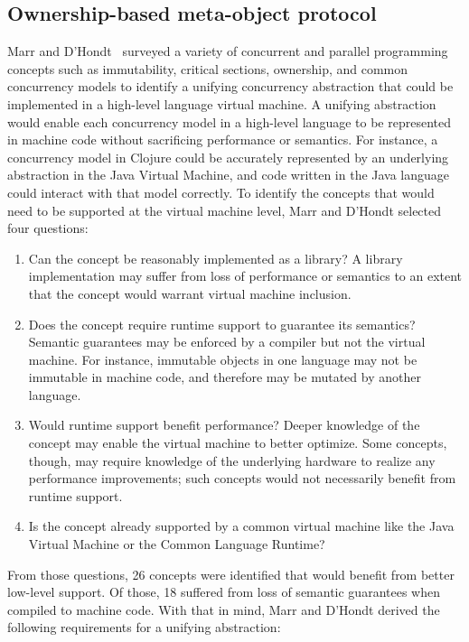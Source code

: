 \documentclass{sig-alternate}
\begin{document}
\subsection{Ownership-based meta-object protocol}

Marr and D'Hondt~\cite{Marr2012} surveyed a variety of concurrent and parallel programming concepts such as immutability, critical sections, ownership, and common concurrency models to identify a unifying concurrency abstraction that could be implemented in a high-level language virtual machine. A unifying abstraction would enable each concurrency model in a high-level language to be represented in machine code without sacrificing performance or semantics. For instance, a concurrency model in Clojure could be accurately represented by an underlying abstraction in the Java Virtual Machine, and code written in the Java language could interact with that model correctly. To identify the concepts that would need to be supported at the virtual machine level, Marr and D'Hondt selected four questions:

\begin{enumerate}
  \item Can the concept be reasonably implemented as a library? A library implementation may suffer from loss of performance or semantics to an extent that the concept would warrant virtual machine inclusion.

  \item Does the concept require runtime support to guarantee its semantics? Semantic guarantees may be enforced by a compiler but not the virtual machine. For instance, immutable objects in one language may not be immutable in machine code, and therefore may be mutated by another language.

  \item Would runtime support benefit performance? Deeper knowledge of the concept may enable the virtual machine to better optimize. Some concepts, though, may require knowledge of the underlying hardware to realize any performance improvements; such concepts would not necessarily benefit from runtime support.

  \item Is the concept already supported by a common virtual machine like the Java Virtual Machine or the Common Language Runtime?
\end{enumerate}

From those questions, 26 concepts were identified that would benefit from better low-level support. Of those, 18 suffered from loss of semantic guarantees when compiled to machine code. With that in mind, Marr and D'Hondt derived the following requirements for a unifying abstraction:
\end{document}
